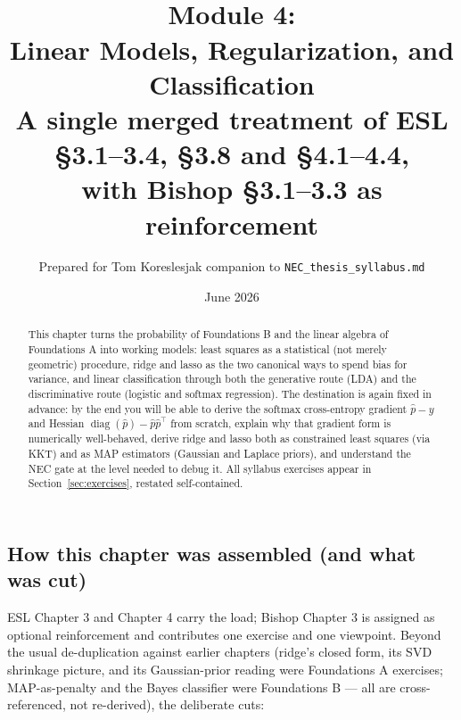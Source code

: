 \documentclass[11pt]{article}
\title{\vspace{-1.2em}{\large\sffamily Foundations for a Quant Research Pipeline}\\[0.4em]
\textbf{Module 4:\\ Linear Models, Regularization, and Classification}\\[0.3em]
{\large A single merged treatment of ESL \S3.1--3.4, \S3.8 and \S4.1--4.4,\\ with Bishop \S3.1--3.3 as reinforcement}}
\author{Prepared for Tom Koreslesjak \;\textperiodcentered\; companion to \texttt{NEC\_thesis\_syllabus.md}}
\date{June 2026}
\numberwithin{equation}{section}
\theoremstyle{plain}
\theoremstyle{definition}
\theoremstyle{remark}
\newcounter{exercise}
\DeclareMathOperator{\diag}{diag}
\newcommand{\T}{\top}
\begin{document}
\maketitle
\vspace{-1.5em}

\begin{abstract}
\noindent This chapter turns the probability of Foundations B and the linear algebra of Foundations A into working models: least squares as a statistical (not merely geometric) procedure, ridge and lasso as the two canonical ways to spend bias for variance, and linear classification through both the generative route (LDA) and the discriminative route (logistic and softmax regression). The destination is again fixed in advance: by the end you will be able to derive the softmax cross-entropy gradient $\hat{p} - y$ and Hessian $\diag(\hat{p}) - \hat{p}\hat{p}^\T$ from scratch, explain why that gradient form is numerically well-behaved, derive ridge and lasso both as constrained least squares (via KKT) and as MAP estimators (Gaussian and Laplace priors), and understand the NEC gate at the level needed to debug it. All syllabus exercises appear in Section~\ref{sec:exercises}, restated self-contained.
\end{abstract}

\tableofcontents

\subsection*{How this chapter was assembled (and what was cut)}

ESL Chapter 3 and Chapter 4 carry the load; Bishop Chapter 3 is assigned as optional reinforcement and contributes one exercise and one viewpoint. Beyond the usual de-duplication against earlier chapters (ridge's closed form, its SVD shrinkage picture, and its Gaussian-prior reading were Foundations A exercises; MAP-as-penalty and the Bayes classifier were Foundations B --- all are cross-referenced, not re-derived), the deliberate cuts:
\end{document}
